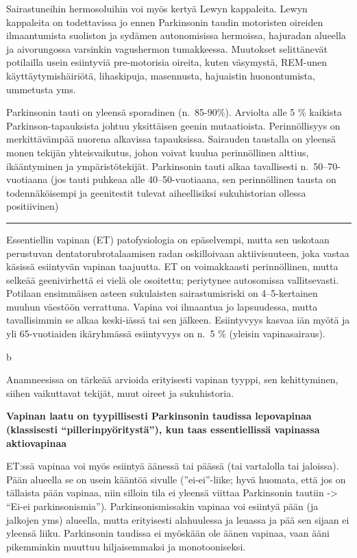 \documentclass[
]{book}
\begin{document}
Sairastuneihin hermosoluihin voi myös kertyä Lewyn kappaleita. Lewyn kappaleita on todettavissa jo ennen Parkinsonin taudin motoristen oireiden ilmaantumista suoliston ja sydämen autonomisissa hermoissa, hajuradan alueella ja aivorungossa varsinkin vagushermon tumakkeessa. Muutokset selittänevät potilailla usein esiintyviä pre-motorisia oireita, kuten väsymystä, REM-unen käyttäytymishäiriötä, lihaskipuja, masennusta, hajuaistin huonontumista, ummetusta yms.

Parkinsonin tauti on yleensä sporadinen (n.~85-90\%). Arviolta alle 5 \% kaikista Parkinson-tapauksista johtuu yksittäisen geenin mutaatioista. Perinnöllisyys on merkittävämpää nuorena alkavissa tapauksissa. Sairauden taustalla on yleensä monen tekijän yhteisvaikutus, johon voivat kuulua perinnöllinen alttius, ikääntyminen ja ympäristötekijät. Parkinsonin tauti alkaa tavallisesti n.~50--70-vuotiaana (jos tauti puhkeaa alle 40--50-vuotiaana, sen perinnöllinen tausta on todennäköisempi ja geenitestit tulevat aiheellisiksi sukuhistorian ollessa positiivinen)

\begin{center}\rule{0.5\linewidth}{0.5pt}\end{center}

Essentiellin vapinan (ET) patofysiologia on epäselvempi, mutta sen uskotaan perustuvan dentatorubrotalaamisen radan oskilloivaan aktiivisuuteen, joka vastaa käsissä esiintyvän vapinan taajuutta. ET on voimakkaasti perinnöllinen, mutta selkeää geenivirhettä ei vielä ole osoitettu; periytynee autosomissa vallitsevasti. Potilaan ensimmäisen asteen sukulaisten sairastumisriski on 4--5-kertainen muuhun väestöön verrattuna. Vapina voi ilmaantua jo lapsuudessa, mutta tavallisimmin se alkaa keski-iässä tai sen jälkeen. Esiintyvyys kasvaa iän myötä ja yli 65-vuotiaiden ikäryhmässä esiintyvyys on n.~5 \% (yleisin vapinasairaus).

b

Anamneesissa on tärkeää arvioida erityisesti vapinan tyyppi, sen kehittyminen, siihen vaikuttavat tekijät, muut oireet ja sukuhistoria.

\textbf{Vapinan laatu on tyypillisesti Parkinsonin taudissa lepovapinaa (klassisesti ``pillerinpyöritystä''), kun taas essentiellissä vapinassa aktiovapinaa}

ET:ssä vapinaa voi myös esiintyä äänessä tai päässä (tai vartalolla tai jaloissa). Pään alueella se on usein kääntöä sivulle (''ei-ei''-liike; hyvä huomata, että jos on tällaista pään vapinaa, niin silloin tila ei yleensä viittaa Parkinsonin tautiin -\textgreater{} ``Ei-ei parkinsonismia''). Parkinsonismissakin vapinaa voi esiintyä pään (ja jalkojen yms) alueella, mutta erityisesti alahuulessa ja leuassa ja pää sen sijaan ei yleensä liiku. Parkinsonin taudissa ei myöskään ole äänen vapinaa, vaan ääni pikemminkin muuttuu hiljaisemmaksi ja monotooniseksi.
\end{document}
